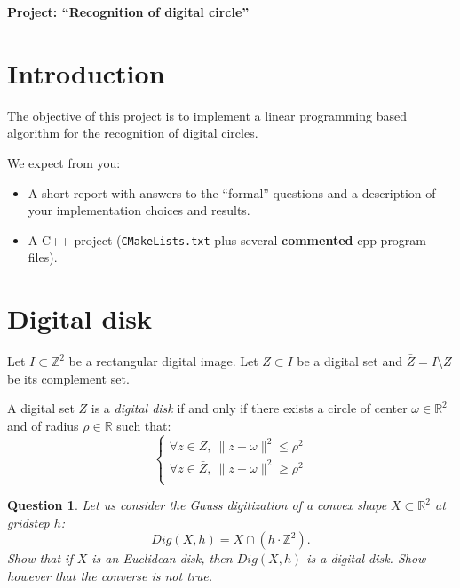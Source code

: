 \documentclass[a4paper, 11pt]{article}
\title{}
\author{}
\date{}
\newtheorem{qu}{Question}
\begin{document}
\begin{center}
	\LARGE \textbf{Project: ``Recognition of digital circle''}
\end{center}

\section*{Introduction}

The objective of this project is to implement a linear programming based algorithm
for the recognition of digital circles. 

We expect from you:
\begin{itemize}
\item A short report with answers to the ``formal'' questions and a
  description of your implementation choices and results.
\item A C++ project (\texttt{CMakeLists.txt} plus several
  \textbf{commented} cpp program files).
\end{itemize}


\section{Digital disk}

Let $I \subset \mathbb{Z}^2$ be a rectangular digital image. Let $Z \subset I$ be 
a digital set and $\bar{Z} = I \setminus Z$ be its complement set.

A digital set $Z$ is a \emph{digital disk} if and only if there exists a circle of 
center $\omega \in \mathbb{R}^2$ and of radius $\rho \in \mathbb{R}$ such that:  
\begin{equation}
  \left\{
  \begin{array}{l}
    \forall z \in Z, \: \| z - \omega \|^2 \leq \rho^2 \\
    \forall z \in \bar{Z}, \: \|  z - \omega \|^2 \geq \rho^2 \\
  \end{array}
  \right.
\end{equation}

\begin{qu}
Let us consider the Gauss digitization of a convex shape $X \subset \mathbb{R}^2$ at gridstep $h$:
\begin{displaymath}
  Dig(X,h) = X\cap (h\cdot \mathbb{Z}^2).
\end{displaymath}
Show that if $X$ is an Euclidean disk, then $Dig(X,h)$ is a digital disk. Show however that 
the converse is not true. 
\end{qu}
\end{document}
